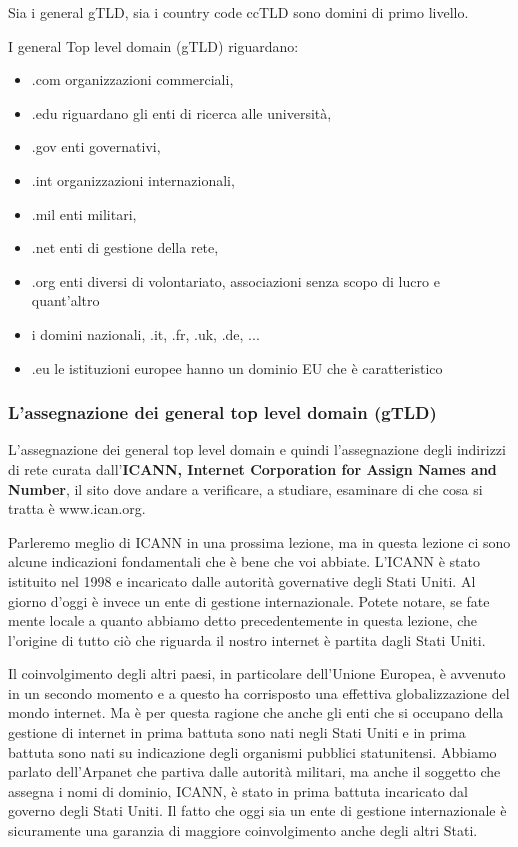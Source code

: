 Sia i general gTLD, sia i country code ccTLD sono domini di primo livello. \par

I general Top level domain (gTLD) riguardano:
\begin{itemize}
    \item .com organizzazioni commerciali,
    \item .edu riguardano gli enti di ricerca alle università,
    \item .gov enti governativi,
    \item .int organizzazioni internazionali,
    \item .mil enti militari,
    \item .net enti di gestione della rete,
    \item .org enti diversi di volontariato, associazioni senza scopo di lucro e quant'altro
    \item i domini nazionali, .it, .fr, .uk, .de, ...
    \item .eu le istituzioni europee hanno un dominio EU che è caratteristico
\end{itemize}

\subsubsection{L'assegnazione dei general top level domain (gTLD)}

L'assegnazione dei general top level domain e quindi l'assegnazione degli indirizzi di rete curata dall'\textbf{ICANN, Internet Corporation for Assign Names and Number}, il sito dove andare a verificare, a studiare, esaminare di che cosa si tratta è www.ican.org. 

Parleremo meglio di ICANN in una prossima lezione, ma in questa lezione ci sono alcune indicazioni fondamentali che è bene che voi abbiate.
L'ICANN è stato istituito nel 1998 e incaricato dalle autorità governative degli Stati Uniti. Al giorno d'oggi è invece un ente di gestione internazionale. Potete notare, se fate mente locale a quanto abbiamo detto precedentemente in questa lezione, che l'origine di tutto ciò che riguarda il nostro internet è partita dagli Stati Uniti.

Il coinvolgimento degli altri paesi, in particolare dell'Unione Europea, è avvenuto in un secondo momento e a questo ha corrisposto una effettiva globalizzazione del mondo internet. Ma è per questa ragione che anche gli enti che si occupano della gestione di internet in prima battuta sono nati negli Stati Uniti e in prima battuta sono nati su indicazione degli organismi pubblici statunitensi. Abbiamo parlato dell'Arpanet che partiva dalle autorità militari, ma anche il soggetto che assegna i nomi di dominio, ICANN, è stato in prima battuta incaricato dal governo degli Stati Uniti. Il fatto che oggi sia un ente di gestione internazionale è sicuramente una garanzia di maggiore coinvolgimento anche degli altri Stati.

